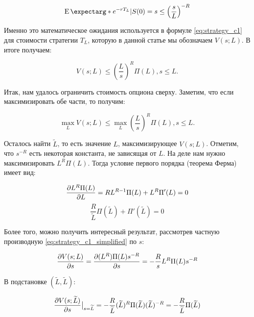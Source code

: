 \documentclass[a4paper,12pt]{article}
\theoremstyle{definition}
\newcommand{\at}[2][]{#1|_{#2}}
\newcommand{\expect}{\operatorname{E}\expectarg}
\begin{document}
\begin{equation*}
    \expect*{e^{-r T_L} | S(0) = s} \le \left(\frac{s}{L}\right)^{-R}
\end{equation*}

Именно это математическое ожидания используется в формуле \eqref{eq:strategy_c1} для стоимости стратегии $T_L$, которую в данной статье мы обозначаем $V(s; L)$. В итоге получаем:

\begin{equation}\label{eq:strategy_c1_simplified}
V(s; L) \le \left(\frac{L}{s}\right)^{R} \Pi(L), s \le L.
\end{equation}

Итак, нам удалось ограничить стоимость опциона сверху. Заметим, что если максимизировать обе части, то получим:

\begin{equation}\label{eq:strategy_c1_maximized}
\max\limits_{L} V(s; L) \le \max\limits_{L} \left(\frac{L}{s}\right)^{R} \Pi(L), s \le L.
\end{equation}

Осталось найти $\widetilde{L}$, то есть значение $L$, максимизирующее $V(s; L)$. Отметим, что $s^{-R}$ есть некоторая константа, не зависящая от $L$. На деле нам нужно максимизировать $L^{R} \Pi(L)$. Тогда условие первого порядка (теорема Ферма) имеет вид:

\begin{equation*}
    \pdv{L^{R} \Pi(L)}{L} = R L^{R - 1} \Pi(L) + L^R \Pi'(L) = 0
\end{equation*}
\begin{equation}\label{eq:first_order_rule_m1}
    \frac{R}{\widetilde{L}} \Pi(\widetilde{L}) + \Pi'(\widetilde{L}) = 0
\end{equation}

Более того, можно получить интересный результат, рассмотрев частную производную \eqref{eq:strategy_c1_simplified} по $s$:

\begin{equation*}
    \pdv{V(s; L)}{s} = \pdv{(L^R) \Pi(L) s^{-R}}{s} = -\frac{R}{s} L^R \Pi(L) s^{-R}
\end{equation*}

В подстановке $(\widetilde{L}, \widetilde{L})$:

\begin{equation*}
    \pdv{V(s; \widetilde{L})}{s}\at[\big]{s=\widetilde{L}} = -\frac{R}{\widetilde{L}} (\widetilde{L})^R \Pi(\widetilde{L}) (\widetilde{L})^{-R} = -\frac{R}{\widetilde{L}} \Pi(\widetilde{L})
\end{equation*}
\end{document}

